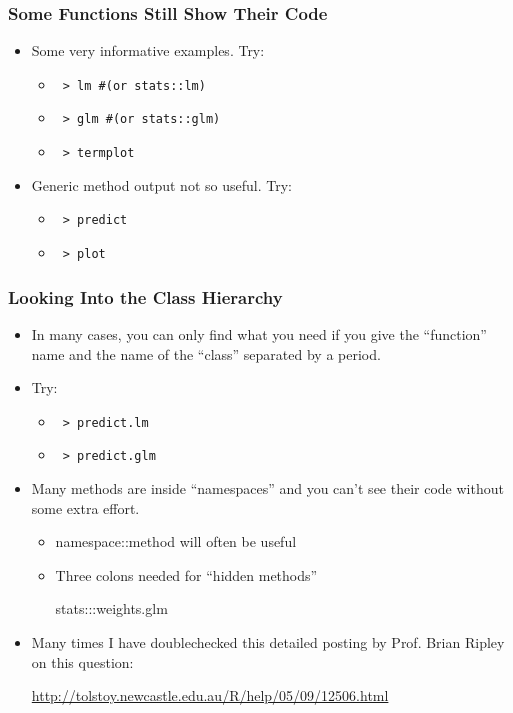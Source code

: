 \documentclass[10pt,english]{beamer}
\begin{document}
\begin{frame}[containsverbatim]
  \frametitle{Some Functions Still Show Their Code}
  \begin{itemize}

   \item Some very informative examples. Try:
      \begin{itemize}
        \item \texttt{ > lm \#(or stats::lm)}
        \item \texttt{ > glm \#(or stats::glm)}
        \item \texttt{ > termplot}
      \end{itemize}

    \item Generic method output not so useful. Try:
      \begin{itemize}
      \item \texttt{ > predict}
      \item \texttt{ > plot}
      \end{itemize}

    \end{itemize}
  \end{frame}


\begin{frame}
  \frametitle{Looking Into the Class Hierarchy}
  \begin{itemize}

  \item In many cases, you can only find what you need if you give
      the ``function'' name and the name of the ``class'' separated by
      a period.

   \item Try:
      \begin{itemize}
      \item \texttt{ > predict.lm }

      \item \texttt{ > predict.glm}
      \end{itemize}

    \item Many methods are inside ``namespaces'' and you can't see
      their code without some extra effort.
      \begin{itemize}
      \item namespace::method will often be useful

      \item Three colons needed for ``hidden methods''

        stats:::weights.glm
      \end{itemize}

    \item Many times I have doublechecked this detailed posting by
      Prof. Brian Ripley on this question:

      \url{http://tolstoy.newcastle.edu.au/R/help/05/09/12506.html}

    \end{itemize}

\end{frame}
\end{document}
